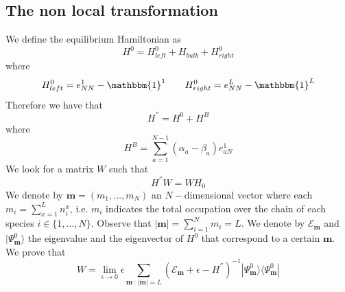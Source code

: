 \documentclass[10pt]{article}
\numberwithin{equation}{section}
\numberwithin{equation}{subsection}
\begin{document}
\subsection{The non local transformation}\label{SectionNonLocalTrasformation}
We define the equilibrium Hamiltonian as
\begin{equation}
	H^{0}=H_{left}^{0}+H_{bulk}+H^{0}_{right}
\end{equation}
where
\begin{equation}
	H_{left}^{0}=e_{NN}^{1}-\mathbbm{1}^{1}\qquad H_{right}^{0}=e_{NN}^{L}-\mathbbm{1}^{L}
\end{equation}
Therefore we have that
\begin{equation}
	H^{''}=H^{0}+H^{B}
\end{equation}
where
\begin{equation}
	H^{B}=\sum_{a=1}^{N-1}(\alpha_{a}-\beta_{a})e_{aN}^{1}
\end{equation}
We look for a matrix $W$ such that 
\begin{equation}\label{GoalWH}
	H^{''}W=WH_{0}
\end{equation}
 We denote by $\bm{m}=(m_{1},\ldots,m_{N})$ an $N-$dimensional vector where each $m_{i}=\sum_{x=1}^{L}n_{i}^{x}$, i.e. $m_{i}$ indicates the total occupation over the chain of each species $i\in\{1,\ldots,N\}$. Observe that $|\bm{m}|=\sum_{i=1}^{N}m_{i}=L$. We denote by $\mathcal{E}_{\bm{m}}$ and $|\Psi_{\bm{m}}^{0}\rangle$ the eigenvalue and the eigenvector of $H^{0}$ that correspond to a certain $\bm{m}$. We prove that 
\begin{equation}\label{W-extended}
	W= \lim_{\epsilon\to 0}\epsilon\sum_{\bm{m}\,:\,|\bm{m}|=L}  \left(\mathcal{E}_{\bm{m}}+\epsilon-H^{''}\right)^{-1}|\Psi_{\bm{m}}^{0}\rangle \langle \Psi_{\bm{m}}^{0}|
\end{equation}
\end{document}
